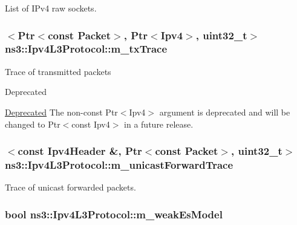 List of I\+Pv4 raw sockets. 

\subsubsection[{\texorpdfstring{m\+\_\+tx\+Trace}{m_txTrace}}]{$<${\bf Ptr}$<$const {\bf Packet}$>$, {\bf Ptr}$<${\bf Ipv4}$>$, uint32\+\_\+t$>$ ns3\+::\+Ipv4\+L3\+Protocol\+::m\+\_\+tx\+Trace\hspace{0.3cm}{\ttfamily [private]}}\hypertarget{classns3_1_1Ipv4L3Protocol_a91a19b062bd7e55da11615385e0e2788}{}\label{classns3_1_1Ipv4L3Protocol_a91a19b062bd7e55da11615385e0e2788}
Trace of transmitted packets \begin{DoxyRefDesc}{Deprecated}
\item[\hyperlink{deprecated__deprecated000008}{Deprecated}]The non-\/const {\ttfamily Ptr$<$\+Ipv4$>$} argument is deprecated and will be changed to {\ttfamily Ptr$<$const Ipv4$>$} in a future release. \end{DoxyRefDesc}
\subsubsection[{\texorpdfstring{m\+\_\+unicast\+Forward\+Trace}{m_unicastForwardTrace}}]{$<$const {\bf Ipv4\+Header} \&, {\bf Ptr}$<$const {\bf Packet}$>$, uint32\+\_\+t$>$ ns3\+::\+Ipv4\+L3\+Protocol\+::m\+\_\+unicast\+Forward\+Trace\hspace{0.3cm}{\ttfamily [private]}}\hypertarget{classns3_1_1Ipv4L3Protocol_acc97efd317fd7e0c1a65c6247fa6537a}{}\label{classns3_1_1Ipv4L3Protocol_acc97efd317fd7e0c1a65c6247fa6537a}


Trace of unicast forwarded packets. 

\subsubsection[{\texorpdfstring{m\+\_\+weak\+Es\+Model}{m_weakEsModel}}]{\setlength{\rightskip}{0pt plus 5cm}bool ns3\+::\+Ipv4\+L3\+Protocol\+::m\+\_\+weak\+Es\+Model\hspace{0.3cm}{\ttfamily [private]}}\hypertarget{classns3_1_1Ipv4L3Protocol_acbe9c4ed9ec7e33a55fa5b7c687e62f3}{}\label{classns3_1_1Ipv4L3Protocol_acbe9c4ed9ec7e33a55fa5b7c687e62f3}


